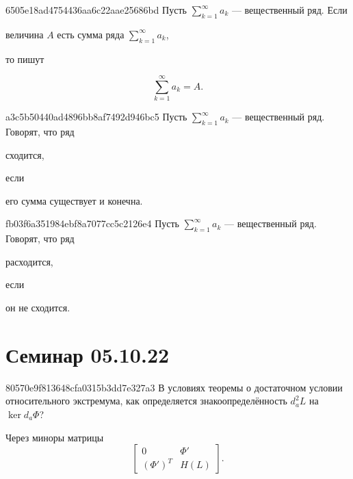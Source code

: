 \begin{note}{6505e18ad4754436aa6c22aae25686bd}
    Пусть \({ \sum_{k=1}^{\infty} a_k }\) --- вещественный ряд.
    Если \begin{icloze}{2}величина \({ A }\) есть сумма ряда \({ \sum_{k=1}^{\infty} a_k }\),\end{icloze} то пишут
    \begin{icloze}{1}
        \[
            \sum_{k=1}^{\infty} a_k = A.
        \]
    \end{icloze}
\end{note}

\begin{note}{a3c5b50440ad4896bb8af7492d946bc5}
    Пусть \({ \sum_{k=1}^{\infty} a_k }\) --- вещественный ряд.
    Говорят, что ряд \begin{icloze}{2}сходится,\end{icloze} если \begin{icloze}{1}его сумма существует и конечна.\end{icloze}
\end{note}

\begin{note}{fb03f6a351984ebf8a7077cc5c2126e4}
    Пусть \({ \sum_{k=1}^{\infty} a_k }\) --- вещественный ряд.
    Говорят, что ряд \begin{icloze}{2}расходится,\end{icloze} если \begin{icloze}{1}он не сходится.\end{icloze}
\end{note}

\section{Семинар 05.10.22}
\begin{note}{80570e9f813648cfa0315b3dd7e327a3}
    В условиях теоремы о достаточном условии относительного экстремума, как определяется знакоопределённость \({ d^2_{a}L }\) на \({ \ker d_{a} \Phi }\)?

    \begin{cloze}{1}
        Через миноры матрицы
        \[
            \begin{bmatrix}
                0 & \Phi' \\
                (\Phi')^{T} & H(L)
            \end{bmatrix}.
        \]
    \end{cloze}
\end{note}

